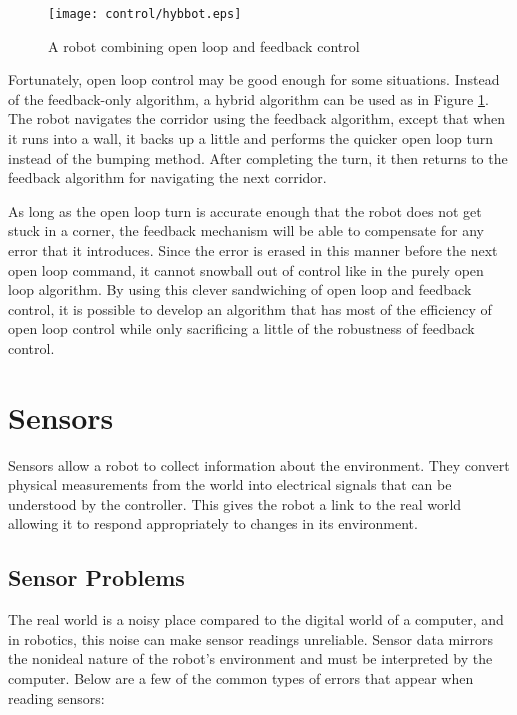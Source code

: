 \begin{figure}[htbp]
\begin{center}
\texttt{[image: control/hybbot.eps]}
 \caption{A robot combining open loop and feedback control}
 \label{hybbot}
\end{center}
\end{figure}

Fortunately, open loop control may be good enough for some
situations. Instead of the feedback-only algorithm, a hybrid algorithm
can be used as in Figure \ref{hybbot}. The robot navigates the
corridor using the feedback algorithm, except that when it runs into a
wall, it backs up a little and performs the quicker open loop turn
instead of the bumping method. After completing the turn, it then
returns to the feedback algorithm for navigating the next corridor.

As long as the open loop turn is accurate enough that the robot does
not get stuck in a corner, the feedback mechanism will be able to
compensate for any error that it introduces. Since the error is erased
in this manner before the next open loop command, it cannot snowball
out of control like in the purely open loop algorithm. By using this
clever sandwiching of open loop and feedback control, it is possible
to develop an algorithm that has most of the efficiency of open loop
control while only sacrificing a little of the robustness of feedback
control.

\section{Sensors}

Sensors allow a robot to collect information about the
environment. They convert physical measurements from the world into
electrical signals that can be understood by the controller. This
gives the robot a link to the real world allowing it to respond
appropriately to changes in its environment.

\subsection{Sensor Problems}

The real world is a noisy place compared to the digital world of a
computer, and in robotics, this noise can make sensor readings
unreliable. Sensor data mirrors the nonideal nature of the robot's
environment and must be interpreted by the computer. Below are a few
of the common types of errors that appear when reading sensors:

